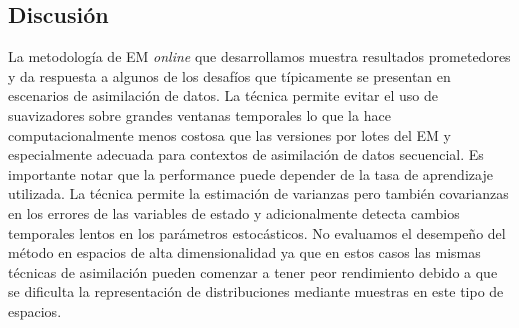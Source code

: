 \subsection{Discusión}

La metodología de EM \textit{online} que desarrollamos muestra resultados prometedores y da respuesta a algunos de los desafíos que típicamente se presentan en escenarios de asimilación de datos. La técnica permite evitar el uso de suavizadores sobre grandes ventanas temporales lo que la hace computacionalmente menos costosa que las versiones por lotes del EM y especialmente adecuada para contextos de asimilación de datos secuencial. Es importante notar que la performance puede depender de la tasa de aprendizaje utilizada. La técnica permite la estimación de varianzas pero también covarianzas en los errores de las variables de estado y adicionalmente detecta cambios temporales lentos en los parámetros estocásticos. No evaluamos el desempeño del método en espacios de alta dimensionalidad ya que en estos casos las mismas técnicas de asimilación pueden comenzar a tener peor rendimiento debido a que se dificulta la representación de distribuciones mediante muestras en este tipo de espacios.
